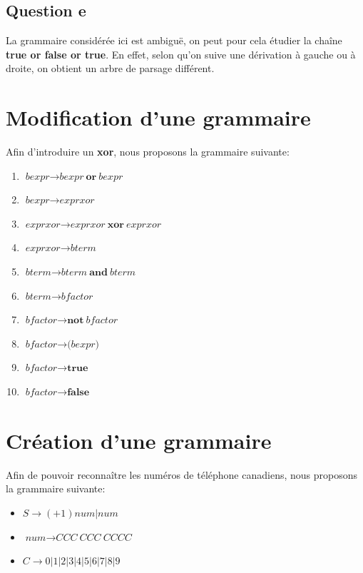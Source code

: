 \documentclass{article}
\begin{document}
 \subsection*{Question e}
 La grammaire considérée ici est ambiguë, on peut pour cela étudier la chaîne \textbf{true or false or true}. En effet, selon qu'on suive une dérivation à gauche ou à droite, on obtient un arbre de parsage différent.
\section{Modification d'une grammaire}
Afin d'introduire un \textbf{xor}, nous proposons la grammaire suivante:
\begin{enumerate}
	\item $\textit{bexpr} \rightarrow \textit{bexpr}\  \textbf{or}\ \textit{bexpr}$
	\item $\textit{bexpr} \rightarrow \textit{exprxor}$
	\item $\textit{exprxor} \rightarrow \textit{exprxor}\  \textbf{xor}\ \textit{exprxor}$
	\item $\textit{exprxor} \rightarrow \textit{bterm}$
	\item $\textit{bterm} \rightarrow \textit{bterm}\  \textbf{and}\ \textit{bterm}$
	\item $\textit{bterm} \rightarrow \textit{bfactor}$
	\item $\textit{bfactor} \rightarrow \textbf{not}\  \textit{bfactor}$
	\item $\textit{bfactor} \rightarrow \textbf{(} \textit{bexpr} \textbf{)}$
	\item $\textit{bfactor} \rightarrow \textbf{true}$
	\item $\textit{bfactor} \rightarrow \textbf{false}$
\end{enumerate}
	
\section{Création d'une grammaire}
Afin de pouvoir reconnaître les numéros de téléphone canadiens, nous proposons la grammaire suivante:
\begin{itemize}
	\item $\textit{S} \rightarrow (+1) \textit{num} | \textit{num}$
	\item $\textit{num} \rightarrow \textit{C}\textit{C}\textit{C}\  \textit{C}\textit{C}\textit{C}\  \textit{C}\textit{C}\textit{C}\textit{C}$
	\item $\textit{C} \rightarrow 0 | 1| 2| 3 | 4 | 5 | 6 | 7 | 8 | 9 $
\end{itemize}
\end{document}

